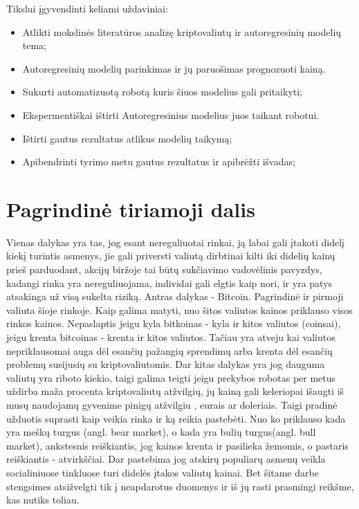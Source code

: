 \documentclass{VUMIFInfKursinis}
\begin{document}
Tikslui įgyvendinti keliami uždaviniai:
\begin{itemize}
  \item Atlikti mokslinės literatūros analizę kriptovaliutų ir autoregresinių modelių tema;
  \item Autoregresinių modelių parinkimas ir jų paruošimas prognozuoti kainą.
  \item Sukurti automatizuotą robotą kuris šiuos modelius gali pritaikyti;
  \item Ekspermentiškai ištirti Autoregresinius modelius juos taikant robotui.
  \item Ištirti gautus rezultatus atlikus modelių taikymą;
  \item Apibendrinti tyrimo metu gautus rezultatus ir apibrėžti išvadas;
\end{itemize}


\section{Pagrindinė tiriamoji dalis}
Vienas dalykas yra tas, jog esant nereguliuotai rinkai, ją labai gali įtakoti didelį kiekį turintis asmenys, jie gali priversti valiutą
dirbtinai kilti iki didelių kainų prieš parduodant, akcijų biržoje tai būtų sukčiavimo vadovėlinis pavyzdys, kadangi rinka yra nereguliuojama,
individai gali elgtis kaip nori, ir yra patys atsakinga už visą sukelta riziką. Antras dalykas - Bitcoin. Pagrindinė ir pirmoji valiuta
šioje rinkoje. Kaip galima matyti, nuo šitos valiutos kainos priklauso visos rinkos kainos. Nepaslaptis jeigu kyla bitkoinas - kyla ir kitos
valiutos (coinsai), jeigu krenta bitcoinas - krenta ir kitos valiutos. Tačiau yra atveju kai valiutos nepriklausomai auga dėl esančių pažangių
sprendimų arba krenta dėl esančių problemų susijusių su kriptovaliutomis. Dar kitas dalykas yra jog dauguma valiutų yra riboto kiekio, taigi galima
teigti jeigu prekybos robotas per metus uždirba maža procenta kriptovaliutų atžvilgių, jų kainą gali keleriopai išaugti iš musų naudojamų gyvenime
pinigų atžvilgiu , eurais ar doleriais. Taigi pradinė užduotis suprasti kaip veikia rinka ir ką reikia pastebėti. Nuo ko priklauso kada yra meškų turgus
(angl. bear market), o kada yra bulių turgus(angl. bull market), ankstesnis reiškiantis, jog kainos krenta ir pasilieka žemomis, o
pastaris reiškiantis - atvirkščiai. Dar pastebima jog atskirų populiarų asmenų veikla socialiniuose tinkluose turi didelės įtakos valiutų kainai.
Bet šitame darbe stengsimes atsižvelgti tik į neapdarotus duomenys ir iš jų rasti prasmingi reikšme, kas nutiks toliau.
\end{document}
